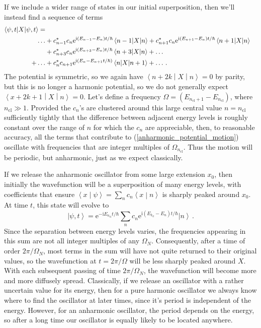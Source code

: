 \documentclass{article}
\theoremstyle{plain}\theoremheaderfont{\normalfont\itshape}\theorembodyfont{\rmfamily}\theoremseparator{.}\newtheorem*{rem}{Remark}\newtheorem*{ex}{Example}\newtheorem*{proof}{Proof}\newtheorem*{altp}{Alternative proof}
\theoremstyle{plain}\theoremheaderfont{\normalfont\bfseries}\theorembodyfont{\rmfamily}\theoremseparator{.}\newtheorem{thm}{Theorem}[section]\newtheorem{lem}[thm]{Lemma}\newtheorem{prop}[thm]{Proposition}\newtheorem*{cor}{Corollary}\newtheorem{defn}[thm]{Definition}\newtheorem{clm}[thm]{Claim}\newtheorem{clminproof}{Claim}
\theoremstyle{break}\theoremheaderfont{\normalfont\itshape}\theorembodyfont{\rmfamily}\theoremseparator{.\medskip}\newtheorem*{proofskip}{Proof}\newtheorem*{exs}{Examples}\newtheorem*{rems}{Remarks}
\theoremstyle{break}\theoremheaderfont{\normalfont\bfseries}\theorembodyfont{\rmfamily}\theoremseparator{.\medskip}\newtheorem{lemskip}[thm]{Lemma}\newtheorem{defnskip}[thm]{Definition}\newtheorem{propskip}[thm]{Proposition}\newtheorem{thmskip}[thm]{Theorem}
\numberwithin{equation}{section}
\newcommand{\ii}{\mathrm{i}}
\newcommand{\ee}{\mathrm{e}}
\newcommand{\ket}[1]{\left| #1 \right\rangle}
\newcommand{\braket}[2]{\left\langle #1 \middle| #2 \right\rangle}
\newcommand{\mel}[3]{\left\langle #1 \middle| #2 \middle| #3 \right\rangle}
\newcommand{\expval}[2]{\left\langle #2 \middle| #1 \middle| #2 \right\rangle}
\begin{document}
    If we include a wider range of states in our initial superposition, then we'll instead find a sequence of terms
    \begin{align}
        \expval{X}{\psi,t}=\notag\\
        \dots&+c_{n-1}^*c_n\ee^{\ii (E_{n-1}-E_n)t/\hbar}\mel{n-1}{X}{n}+c_{n+1}^*c_n\ee^{\ii (E_{n+1}-E_n)t/\hbar}\mel{n+1}{X}{n}\notag\\
        &+c_{n+3}^*c_n\ee^{\ii (E_{n+3}-E_n)t/\hbar}\mel{n+3}{X}{n}+\dots\notag\\
        +\dots&+c_n^*c_{n+1}\ee^{\ii (E_n-E_{n+1}t/\hbar)}\mel{n}{X}{n+1}+\dots\,.\label{anharmonic_potential_motion}
    \end{align}
    The potential is symmetric, so we again have \(\mel{n+2k}{X}{n}=0\) by parity, but this is no longer a harmonic potential, so we do not generally expect \(\mel{x+2k+1}{X}{n}=0\).  Let's define a frequency \(\Omega=(E_{n_\text{cl}+1}-E_{n_\text{cl}})\), where \(n_{\text{cl}}\gg 1\). Provided the \(c_n\)'s are clustered around this large central value \(n=n_{\text{cl}}\) sufficiently tightly that the difference between adjacent energy levels is roughly constant over the range of \(n\) for which the \(c_n\) are appreciable, then, to reasonable accuracy, all the terms that contribute to (\ref{anharmonic_potential_motion}) oscillate with frequencies that are integer multiples of \(\Omega_{n_{\text{cl}}}\). Thus the motion will be periodic, but anharmonic, just as we expect classically.

    If we release the anharmonic oscillator from some large extension \(x_0\), then initially the wavefunction will be a superposition of many energy levels, with coefficients that ensure \(\braket{x}{\psi}=\sum_n c_n\braket{x}{n}\) is sharply peaked around \(x_0\). At time \(t\), this state will evolve to
    \begin{equation}
        \ket{\psi,t}=\ee^{-\ii E_{n_\text{cl}}t/\hbar}\sum_{n}c_n \ee^{\ii (E_{b_\text{cl}}-E_n)t/\hbar}\ket{n}\,.
    \end{equation}
    Since the separation between energy levels varies, the frequencies appearing in this sum are not all integer multiples of any \(\Omega_N\). Consequently, after a time of order \(2\pi/\Omega_N\), most terms in the sum will have not quite returned to their original values, so the wavefunction at \(t=2\pi/\Omega\) will be less sharply peaked around \(X\). With each subsequent passing of time \(2\pi/\Omega_N\), the wavefunction will become more and more diffusely spread. Classically, if we release an oscillator with a rather uncertain value for its energy, then for a pure harmonic oscillator we always know where to find the oscillator at later times, since it's period is independent of the energy. However, for an anharmonic oscillator, the period depends on the energy, so after a long time our oscillator is equally likely to be located anywhere.
\end{document}

